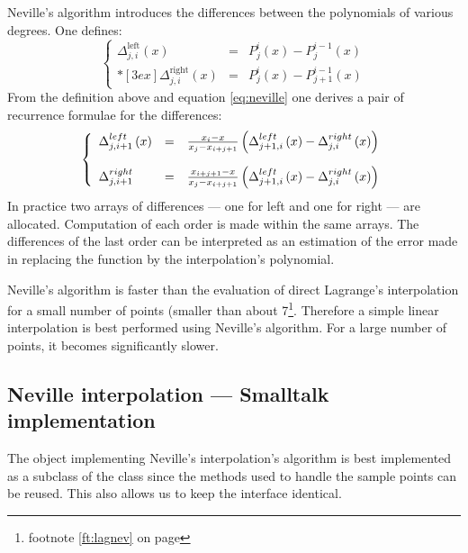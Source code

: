 Neville's algorithm introduces the differences between the
polynomials of various degrees. One defines:
\begin{equation}
\left\{ \begin{array}{lcl} \Delta_{j,i}^{\mathop
{left}}\left(x\right)
&=&P^i_j\left(x\right)-P^{i-1}_j\left(x\right)
\\*[3 ex] \Delta_{j,i}^{\mathop{right}}\left(x\right) &=&P^i_j\left(x\right)-P^{i-1}_{j+1}\left(x\right)
\end{array}\right.
\end{equation}
From the definition above and equation \ref{eq:neville} one
derives a pair of recurrence formulae for the differences:
\begin{equation}
\left\{ \begin{array}{lcl}\Delta_{j,i+1}^{\mathop
{left}}\left(x\right) &=&{x_i-x\over
x_j-x_{i+j+1}}\left(\Delta_{j+1,i}^{\mathop
{left}}\left(x\right)-\Delta_{j,i}^{\mathop
{right}}\left(x\right)\right)
\\*[3 ex] \Delta_{j,i+1}^{\mathop{right}} &=&{x_{i+j+1}-x\over
x_j-x_{i+j+1}}\left(\Delta_{j+1,i}^{\mathop
{left}}\left(x\right)-\Delta_{j,i}^{\mathop
{right}}\left(x\right)\right)
\end{array}\right.
\end{equation}
In practice two arrays of differences --- one for left and one for
right --- are allocated. Computation of each order is made within
the same arrays. The differences of the last order can be
interpreted as an estimation of the error made in replacing the
function by the interpolation's polynomial.

Neville's algorithm is faster than the evaluation of direct
Lagrange's interpolation for a small number of points (smaller
than about 7\footnote{\cf footnote \ref{ft:lagnev} on page
\pageref{ft:lagnev}}. Therefore a simple linear interpolation is
best performed using Neville's algorithm. For a large number of
points, it becomes significantly slower.

\subsection{ Neville interpolation --- Smalltalk  implementation}
The object implementing Neville's interpolation's algorithm is best implemented as a subclass of the
class  since the methods used to handle
the sample points can be reused. This also allows us to keep the
interface identical.

